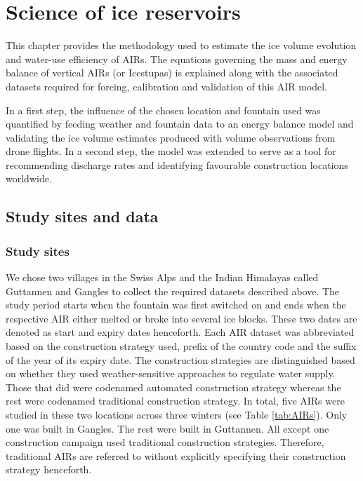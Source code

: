 \chapter{Science of ice reservoirs}

This chapter provides the methodology used to estimate the ice volume evolution and water-use efficiency of
AIRs. The equations governing the mass and energy balance of vertical AIRs (or Icestupas) is explained along
with the associated datasets required for forcing, calibration and validation of this AIR model.

In a first step, the influence of the chosen location and fountain used was quantified by feeding weather and
fountain data to an energy balance model and validating the ice volume estimates produced with volume
observations from drone flights. In a second step, the model was extended to serve as a tool for recommending
discharge rates and identifying favourable construction locations worldwide.

\section{Study sites and data}

\subsection{Study sites}

We chose two villages in the Swiss Alps and the Indian Himalayas called Guttannen and Gangles to collect the
required datasets described above. The study period starts when the fountain was first switched on and ends when
the respective AIR either melted or broke into several ice blocks. These two dates are denoted as start and
expiry dates henceforth. Each AIR dataset was abbreviated based on the construction strategy used, prefix of the
country code and the suffix of the year of its expiry date. The construction strategies are distinguished based
on whether they used weather-sensitive approaches to regulate water supply. Those that did were codenamed
automated construction strategy whereas the rest were codenamed traditional construction strategy. In total,
five AIRs were studied in these two locations across three winters (see Table \ref{tab:AIRs}). Only one was
built in Gangles. The rest were built in Guttannen. All except one construction campaign used traditional
construction strategies. Therefore, traditional AIRs are referred to without explicitly specifying their
construction strategy henceforth.

